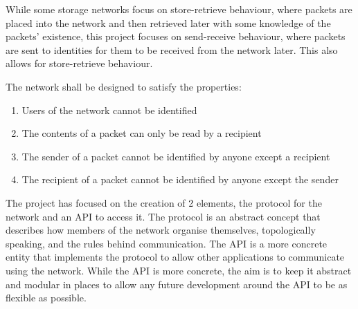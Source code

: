 	While some storage networks focus on store-retrieve behaviour, where packets are placed into the network and then retrieved later with some knowledge of the packets' existence, this project focuses on send-receive behaviour, where packets are sent to identities for them to be received from the network later. This also allows for store-retrieve behaviour.
	
	The network shall be designed to satisfy the properties:
	\begin{enumerate}[topsep=-5pt,itemsep=-1ex,partopsep=2ex,parsep=1.5ex]
		\item Users of the network cannot be identified
		\item The contents of a packet can only be read by a recipient
		\item The sender of a packet cannot be identified by anyone except a recipient
		\item The recipient of a packet cannot be identified by anyone except the sender
	\end{enumerate} \vspace{0.5ex}
	
	The project has focused on the creation of 2 elements, the protocol for the network and an API to access it. The protocol is an abstract concept that describes how members of the network organise themselves, topologically speaking, and the rules behind communication. The API is a more concrete entity that implements the protocol to allow other applications to communicate using the network. While the API is more concrete, the aim is to keep it abstract and modular in places to allow any future development around the API to be as flexible as possible.
